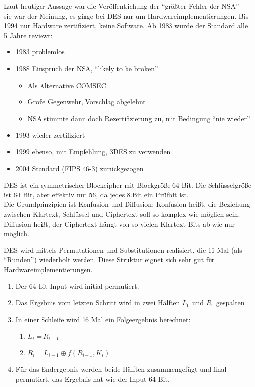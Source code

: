 Laut heutiger Aussage war die Veröffentlichung der ``größter Fehler der NSA'' - sie war der Meinung, es ginge bei DES nur um Hardwareimplementierungen.
Bis 1994 nur Hardware zertifiziert, keine Software. Ab 1983 wurde der Standard alle 5 Jahre reviewt:

\begin{itemize}
    \item 1983 problemlos
    \item 1988 Einspruch der NSA, ``likely to be broken''
    \begin{itemize}
        \item Als Alternative COMSEC
        \item Große Gegenwehr, Vorschlag abgelehnt
        \item NSA stimmte dann doch Rezertifizierung zu, mit Bedingung ``nie wieder''
    \end{itemize}
    \item 1993 wieder zertifiziert
    \item 1999 ebenso, mit Empfehlung, 3DES zu verwenden
    \item 2004 Standard (FIPS 46-3) zurückgezogen
\end{itemize}

DES ist ein symmetrischer Blockcipher mit Blockgröße 64 Bit. Die Schlüsselgröße ist 64 Bit, aber effektiv nur 56, da jedes 8.Bit ein Prüfbit ist. \\

Die Grundprinzipien ist Konfusion und Diffusion: Konfusion  heißt, die Beziehung zwischen Klartext, Schlüssel und Ciphertext soll so komplex wie möglich 
sein.
Diffusion  heißt, der Ciphertext hängt von so vielen Klartext Bits ab wie nur möglich.

DES wird mittels Permutationen und Substitutionen realisiert, die 16 Mal (als ``Runden'') wiederholt werden. Diese Struktur eignet sich sehr gut für 
Hardwareimplementierungen.

\begin{enumerate}
    \item Der 64-Bit Input wird initial permutiert.
    \item Das Ergebnis vom letzten Schritt wird in zwei Hälften $L_0$ und $R_0$ gespalten
    \item In einer Schleife wird 16 Mal ein Folgeergebnis berechnet: 
    \begin{enumerate}
        \item $L_i = R_{i-1}$
        \item $R_i = L_{i-1} \oplus f(R_{i-1}, K_i)$
    \end{enumerate}
    \item Für das Endergebnis werden beide Hälften zusammengefügt und final permutiert, das Ergebnis hat wie der Input 64 Bit.
\end{enumerate}

